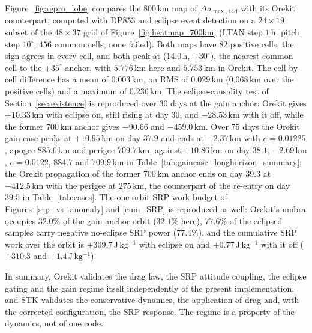 \vspace{5pt}
\par\noindent Figure~\ref{fig:repro_lobe} compares the \(800\,\mathrm{km}\) map of \(\Delta a_{\max,14\mathrm{d}}\) with its Orekit counterpart, computed with DP853 and eclipse event detection on a \(24\times19\) subset of the \(48\times37\) grid of Figure~\ref{fig:heatmap_700km} (LTAN step \(1\,\mathrm{h}\), pitch step \(10^\circ\); \(456\) common cells, none failed). Both maps have \(82\) positive cells, the sign agrees in every cell, and both peak at (\(14.0\,\mathrm{h}\), \(+30^\circ\)), the nearest common cell to the \(+35^\circ\) anchor, with \(5.776\,\mathrm{km}\) here and \(5.753\,\mathrm{km}\) in Orekit. The cell-by-cell difference has a mean of \(0.003\,\mathrm{km}\), an RMS of \(0.029\,\mathrm{km}\) (\(0.068\,\mathrm{km}\) over the positive cells) and a maximum of \(0.236\,\mathrm{km}\). The eclipse-causality test of Section~\ref{sec:existence} is reproduced over \(30\) days at the gain anchor: Orekit gives \(+10.33\,\mathrm{km}\) with eclipse on, still rising at day \(30\), and \(-28.53\,\mathrm{km}\) with it off, while the former \(700\,\mathrm{km}\) anchor gives \(-90.66\) and \(-459.0\,\mathrm{km}\). Over \(75\) days the Orekit gain case peaks at \(+10.95\,\mathrm{km}\) on day \(37.9\) and ends at \(-2.37\,\mathrm{km}\) with \(e = 0.01225\), apogee \(885.6\,\mathrm{km}\) and perigee \(709.7\,\mathrm{km}\), against \(+10.86\,\mathrm{km}\) on day \(38.1\), \(-2.69\,\mathrm{km}\), \(e = 0.0122\), \(884.7\) and \(709.9\,\mathrm{km}\) in Table~\ref{tab:gaincase_longhorizon_summary}; the Orekit propagation of the former \(700\,\mathrm{km}\) anchor ends on day \(39.3\) at \(-412.5\,\mathrm{km}\) with the perigee at \(275\,\mathrm{km}\), the counterpart of the re-entry on day \(39.5\) in Table~\ref{tab:cases}. The one-orbit SRP work budget of Figures~\ref{srp_vs_anomaly} and \ref{cum_SRP} is reproduced as well: Orekit's umbra occupies \(32.0\%\) of the gain-anchor orbit (\(32.1\%\) here), \(77.6\%\) of the eclipsed samples carry negative no-eclipse SRP power (\(77.4\%\)), and the cumulative SRP work over the orbit is \(+309.7\,\mathrm{J\,kg^{-1}}\) with eclipse on and \(+0.77\,\mathrm{J\,kg^{-1}}\) with it off (\(+310.3\) and \(+1.4\,\mathrm{J\,kg^{-1}}\)).

\vspace{5pt}
\par\noindent In summary, Orekit validates the drag law, the SRP attitude coupling, the eclipse gating and the gain regime itself independently of the present implementation, and STK validates the conservative dynamics, the application of drag and, with the corrected configuration, the SRP response. The regime is a property of the dynamics, not of one code.

